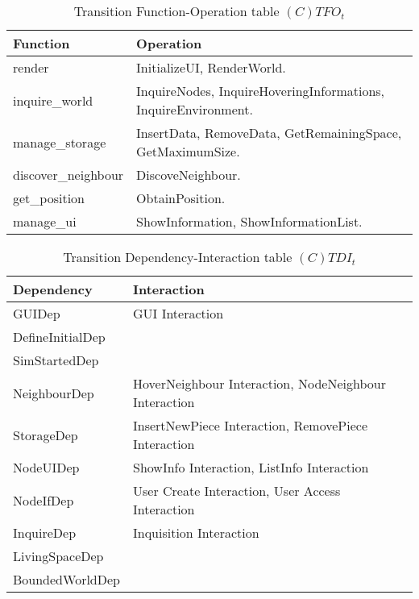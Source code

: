 \begin{table}[H]
	\centering
	\begin{tabular}{|p{4cm}|p{8cm}|}
			\hline
			\textbf{Function} & \textbf{Operation} \\
			\hline
			render & InitializeUI, RenderWorld. \\
			\hline
			inquire\_world & InquireNodes, InquireHoveringInformations, InquireEnvironment. \\
			\hline
			manage\_storage & InsertData, RemoveData, GetRemainingSpace,
			GetMaximumSize. \\
			\hline
			discover\_neighbour & DiscoveNeighbour. \\
			\hline
			get\_position & ObtainPosition. \\
			\hline
			manage\_ui & ShowInformation, ShowInformationList. \\
			\hline
		\end{tabular}
	\caption{Transition Function-Operation table $(C)TFO_t$}
	\label{tab:ctfot}
\end{table}

\begin{table}[H]
	\centering
	\begin{tabular}{|p{4cm}|p{8cm}|}
			\hline
			\textbf{Dependency} & \textbf{Interaction} \\
			\hline
			GUIDep & GUI Interaction \\
			\hline
			DefineInitialDep & \\
			\hline
			SimStartedDep & \\
			\hline
			NeighbourDep & HoverNeighbour Interaction, NodeNeighbour Interaction\\
			\hline
			StorageDep & InsertNewPiece Interaction, RemovePiece Interaction \\
			\hline
			NodeUIDep & ShowInfo Interaction, ListInfo Interaction \\
			\hline
			NodeIfDep & User Create Interaction, User Access Interaction \\
			\hline
			InquireDep & Inquisition Interaction\\
			\hline
			LivingSpaceDep & \\
			\hline
			BoundedWorldDep & \\
			\hline
		\end{tabular}
	\caption{Transition Dependency-Interaction table $(C)TDI_t$}
	\label{tab:ctdit}
\end{table}

